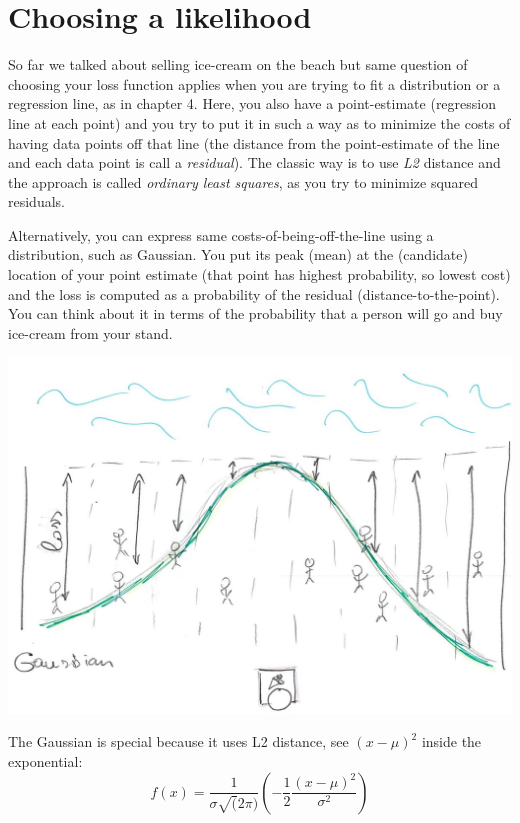 \documentclass[
]{book}
\begin{document}
\hypertarget{choosing-a-likelihood}{%
\section{Choosing a likelihood}\label{choosing-a-likelihood}}

So far we talked about selling ice-cream on the beach but same question of choosing your loss function applies when you are trying to fit a distribution or a regression line, as in chapter 4. Here, you also have a point-estimate (regression line at each point) and you try to put it in such a way as to minimize the costs of having data points off that line (the distance from the point-estimate of the line and each data point is call a \emph{residual}). The classic way is to use \emph{L2} distance and the approach is called \emph{ordinary least squares}, as you try to minimize squared residuals.

Alternatively, you can express same costs-of-being-off-the-line using a distribution, such as Gaussian. You put its peak (mean) at the (candidate) location of your point estimate (that point has highest probability, so lowest cost) and the loss is computed as a probability of the residual (distance-to-the-point). You can think about it in terms of the probability that a person will go and buy ice-cream from your stand.

\begin{center}\includegraphics[width=1\linewidth]{images/loss-functions-Gaussian} \end{center}

The Gaussian is special because it uses L2 distance, see \((x - \mu)^2\) inside the exponential:
\[f(x) = \frac{1}{\sigma \sqrt(2 \pi)}\left(-\frac{1}{2}\frac{(x - \mu)^2}{\sigma^2}\right)\]
\end{document}
